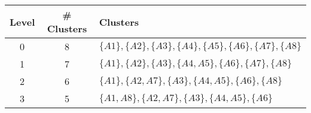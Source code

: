 \documentclass[aspectratio=169, 10pt]{beamer}
\begin{document}
\begin{frame}[t]
    \begin{table}[]
        \scriptsize
        \begin{tabular}{c|c|l}
        Level & \# Clusters & Clusters \\ \hline
        0     & 8           & $\{A1\}, \{A2\}, \{A3\}, \{A4\}, \{A5\}, \{A6\}, \{A7\}, \{A8\}$\\
        1     & 7           & $\{A1\}, \{A2\}, \{A3\}, \{A4, A5\}, \{A6\}, \{A7\}, \{A8\}$\\
        2     & 6           & $\{A1\}, \{A2, A7\}, \{A3\}, \{A4, A5\}, \{A6\}, \{A8\}$\\
        3     & 5           & $\{A1, A8\}, \{A2, A7\}, \{A3\}, \{A4, A5\}, \{A6\}$\\
        \end{tabular}
    \end{table}

\end{frame}
\end{document}
